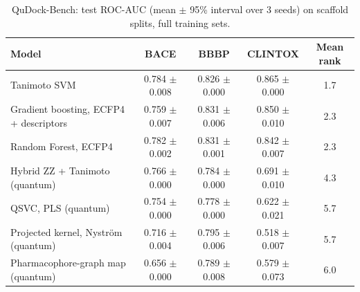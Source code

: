 \begin{table}[h]
\centering
\caption{QuDock-Bench: test ROC-AUC (mean $\pm$ 95\% interval over 3 seeds) on scaffold splits, full training sets.}
\label{tab:bench}
\small
\begin{tabular}{lcccc}
\toprule
Model & BACE & BBBP & CLINTOX & Mean rank\\
\midrule
Tanimoto SVM & 0.784 $\pm$ 0.008 & 0.826 $\pm$ 0.000 & 0.865 $\pm$ 0.000 & 1.7\\
Gradient boosting, ECFP4 + descriptors & 0.759 $\pm$ 0.007 & 0.831 $\pm$ 0.006 & 0.850 $\pm$ 0.010 & 2.3\\
Random Forest, ECFP4 & 0.782 $\pm$ 0.002 & 0.831 $\pm$ 0.001 & 0.842 $\pm$ 0.007 & 2.3\\
Hybrid ZZ + Tanimoto (quantum) & 0.766 $\pm$ 0.000 & 0.784 $\pm$ 0.000 & 0.691 $\pm$ 0.010 & 4.3\\
QSVC, PLS (quantum) & 0.754 $\pm$ 0.000 & 0.778 $\pm$ 0.000 & 0.622 $\pm$ 0.021 & 5.7\\
Projected kernel, Nystr\"om (quantum) & 0.716 $\pm$ 0.004 & 0.795 $\pm$ 0.006 & 0.518 $\pm$ 0.007 & 5.7\\
Pharmacophore-graph map (quantum) & 0.656 $\pm$ 0.000 & 0.789 $\pm$ 0.008 & 0.579 $\pm$ 0.073 & 6.0\\
\bottomrule
\end{tabular}
\end{table}
